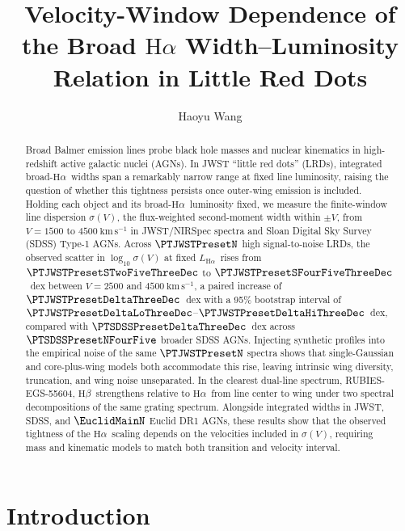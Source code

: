 \documentclass[twocolumn]{aastex631}
\newcommand{\Ha}{\ensuremath{\mathrm{H}\alpha}}
\newcommand{\Hb}{\ensuremath{\mathrm{H}\beta}}
\newcommand{\kms}{\ensuremath{\mathrm{km\,s^{-1}}}}
\newcommand{\LHa}{\ensuremath{L_{\mathrm{H}\alpha}}}
\newcommand{\sigV}{\ensuremath{\sigma(V)}}
\begin{document}
\title{Velocity-Window Dependence of the Broad \texorpdfstring{\Ha}{H-alpha} Width--Luminosity Relation in Little Red Dots}


\author[0009-0005-9117-0842]{Haoyu Wang}

\begin{abstract}
Broad Balmer emission lines probe black hole masses and nuclear kinematics in high-redshift active galactic nuclei (AGNs). In JWST ``little red dots'' (LRDs), integrated broad-\Ha\ widths span a remarkably narrow range at fixed line luminosity, raising the question of whether this tightness persists once outer-wing emission is included. Holding each object and its broad-\Ha\ luminosity fixed, we measure the finite-window line dispersion \sigV, the flux-weighted second-moment width within $\pm V$, from $V = 1500$ to $4500~\kms$ in JWST/NIRSpec spectra and Sloan Digital Sky Survey (SDSS) Type-1 AGNs. Across $\PTJWSTPresetN$ high signal-to-noise LRDs, the observed scatter in $\log_{10}\sigV$ at fixed \LHa\ rises from $\PTJWSTPresetSTwoFiveThreeDec$ to $\PTJWSTPresetSFourFiveThreeDec$~dex between $V = 2500$ and $4500~\kms$, a paired increase of $\PTJWSTPresetDeltaThreeDec$~dex with a 95\% bootstrap interval of $\PTJWSTPresetDeltaLoThreeDec$--$\PTJWSTPresetDeltaHiThreeDec$~dex, compared with $\PTSDSSPresetDeltaThreeDec$~dex across $\PTSDSSPresetNFourFive$ broader SDSS AGNs. Injecting synthetic profiles into the empirical noise of the same $\PTJWSTPresetN$ spectra shows that single-Gaussian and core-plus-wing models both accommodate this rise, leaving intrinsic wing diversity, truncation, and wing noise unseparated. In the clearest dual-line spectrum, RUBIES-EGS-55604, \Hb\ strengthens relative to \Ha\ from line center to wing under two spectral decompositions of the same grating spectrum. Alongside integrated widths in JWST, SDSS, and $\EuclidMainN$ Euclid DR1 AGNs, these results show that the observed tightness of the \Ha\ scaling depends on the velocities included in \sigV, requiring mass and kinematic models to match both transition and velocity interval.
\end{abstract}


\section{Introduction}
\label{sec:intro}
\end{document}
